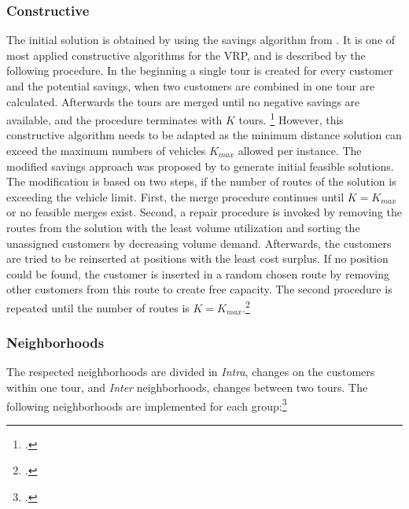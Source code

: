 \subsubsection{Constructive}
The initial solution is obtained by using the savings algorithm from \cite{clarke_scheduling_1964}. It is one of
most applied constructive algorithms for the \gls{VRP}, and is described by the following procedure. In the beginning
a single tour is created for every customer and the potential savings, when two customers are combined in one tour are calculated.
Afterwards the tours are merged until no negative savings are available, and the
procedure terminates with $K$ tours. \footcite[cf.][]{clarke_scheduling_1964} However, this constructive algorithm needs to be adapted
as the minimum distance solution can exceed the maximum numbers of vehicles $K_{max}$ allowed per instance.
The modified savings approach was proposed by \cite{zhang_evolutionary_2015} to generate initial feasible solutions.
The modification is based on two steps, if the number of routes of the solution is exceeding the vehicle limit. First,
the merge procedure continues until $K = K_{max}$ or no feasible merges exist. Second, a repair procedure is invoked
by removing the routes from the solution with the least volume utilization and sorting the unassigned customers by
decreasing volume demand. Afterwards, the customers are tried to be reinserted at positions with the least
cost surplus. If no position could be found, the customer is inserted in a random chosen route by removing
other customers from this route to create free capacity. The second procedure is repeated until the
number of routes is $K = K_{max}$.\footcite[cf.][p. 24]{zhang_evolutionary_2015}

\subsubsection{Neighborhoods}
\label{sec:neighborhoods}

The respected neighborhoods are divided in \textit{Intra}, changes on the customers within one tour, and \textit{Inter} neighborhoods,
changes between two tours. The following neighborhoods are implemented for each group:\footcite[cf.][p. 89f]{toth_vehicle_2014}

